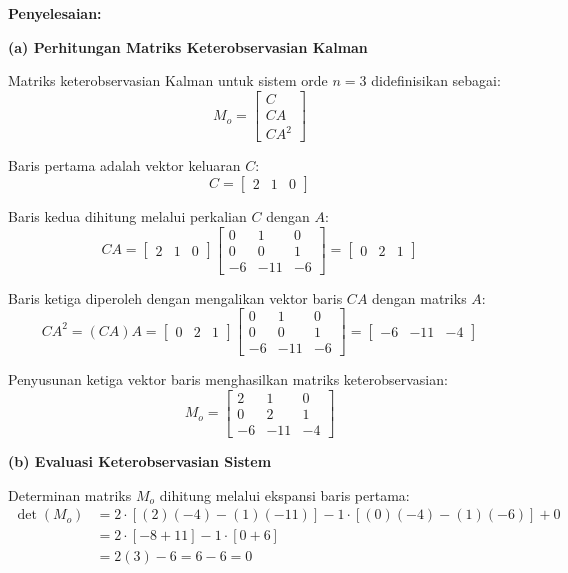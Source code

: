 \documentclass[11pt,a4paper]{article}
\begin{document}
\textbf{Penyelesaian:}

\textbf{(a) Perhitungan Matriks Keterobservasian Kalman}

Matriks keterobservasian Kalman untuk sistem orde $n = 3$ didefinisikan sebagai:
$$M_o = \begin{bmatrix} C \\ CA \\ CA^2 \end{bmatrix}$$

Baris pertama adalah vektor keluaran $C$:
$$C = \begin{bmatrix} 2 & 1 & 0 \end{bmatrix}$$

Baris kedua dihitung melalui perkalian $C$ dengan $A$:
$$CA = \begin{bmatrix} 2 & 1 & 0 \end{bmatrix} \begin{bmatrix} 0 & 1 & 0 \\ 0 & 0 & 1 \\ -6 & -11 & -6 \end{bmatrix} = \begin{bmatrix} 0 & 2 & 1 \end{bmatrix}$$

Baris ketiga diperoleh dengan mengalikan vektor baris $CA$ dengan matriks $A$:
$$CA^2 = (CA)A = \begin{bmatrix} 0 & 2 & 1 \end{bmatrix} \begin{bmatrix} 0 & 1 & 0 \\ 0 & 0 & 1 \\ -6 & -11 & -6 \end{bmatrix} = \begin{bmatrix} -6 & -11 & -4 \end{bmatrix}$$

Penyusunan ketiga vektor baris menghasilkan matriks keterobservasian:
$$M_o = \begin{bmatrix} 2 & 1 & 0 \\ 0 & 2 & 1 \\ -6 & -11 & -4 \end{bmatrix}$$

\textbf{(b) Evaluasi Keterobservasian Sistem}

Determinan matriks $M_o$ dihitung melalui ekspansi baris pertama:
\begin{align*}
    \det(M_o) &= 2 \cdot [(2)(-4) - (1)(-11)] - 1 \cdot [(0)(-4) - (1)(-6)] + 0 \\
    &= 2 \cdot [-8 + 11] - 1 \cdot [0 + 6] \\
    &= 2(3) - 6 = 6 - 6 = 0
\end{align*}
\end{document}
